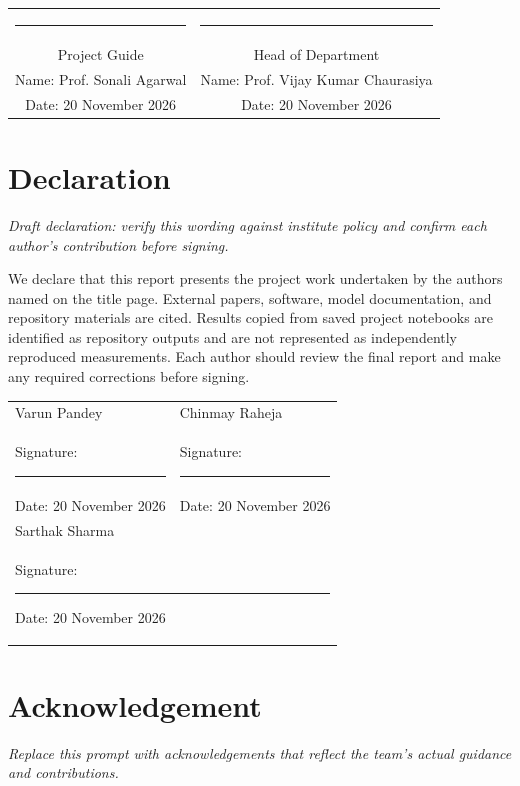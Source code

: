 \documentclass[12pt,a4paper]{report}
\begin{document}
\vspace{1.0in}
\noindent
\begin{tabular}{cc}
\rule{2.4in}{0.4pt} & \rule{2.4in}{0.4pt}\\[-0.1em]
Project Guide & Head of Department\\
Name: Prof. Sonali Agarwal & Name: Prof. Vijay Kumar Chaurasiya\\
Date: 20 November 2026 & Date: 20 November 2026
\end{tabular}

\chapter*{Declaration}
\textit{Draft declaration: verify this wording against institute policy and confirm each author's contribution before signing.}

We declare that this report presents the project work undertaken by the authors named on the title page. External papers, software, model documentation, and repository materials are cited. Results copied from saved project notebooks are identified as repository outputs and are not represented as independently reproduced measurements. Each author should review the final report and make any required corrections before signing.

\vspace{0.8in}
\begin{tabularx}{\linewidth}{X X}
Varun Pandey & Chinmay Raheja\\[0.35in]
Signature: \rule{2.1in}{0.4pt} & Signature: \rule{2.1in}{0.4pt}\\[0.2in]
Date: 20 November 2026 & Date: 20 November 2026\\[0.45in]
\multicolumn{2}{l}{Sarthak Sharma}\\[0.35in]
\multicolumn{2}{l}{Signature: \rule{2.1in}{0.4pt}\hspace{1.1in}Date: 20 November 2026}
\end{tabularx}

\chapter*{Acknowledgement}
\textit{Replace this prompt with acknowledgements that reflect the team's actual guidance and contributions.}
\end{document}
